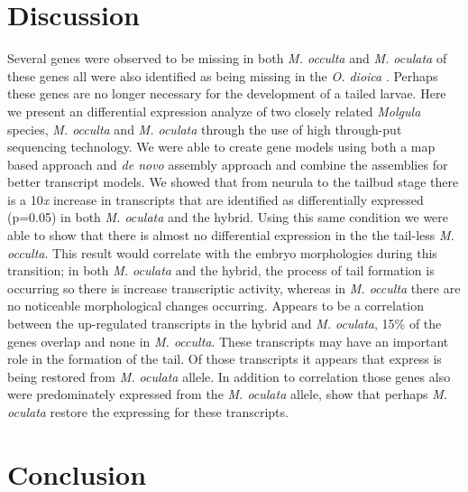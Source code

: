 \section{Discussion}
Several genes were observed to be missing in both \textit{M. occulta} and \textit{M. oculata} of these genes all were also identified as being missing in the \textit{O. dioica} \cite{kugler_evolutionary_2011}. Perhaps these genes are no longer necessary for the development of a tailed larvae.
Here we present an differential expression analyze of two closely related \textit{Molgula} species, \textit{M. occulta} and \textit{M. oculata} through the use of high through-put sequencing technology. We were able to create gene models using both a map based approach and \textit{de novo} assembly approach and combine the assemblies for better transcript models. We showed that from neurula to the tailbud stage there is a 10\textit{x} increase in transcripts that are identified as differentially expressed (p=0.05) in both \textit{M. oculata} and the hybrid. Using this same condition we were able to show that there is almost no differential expression in the the tail-less \textit{M. occulta}. This result would correlate with the embryo morphologies during this transition; in both  \textit{M. oculata} and the hybrid, the process of tail formation is occurring so there is increase transcriptic activity, whereas in \textit{M. occulta} there are no noticeable morphological changes occurring. Appears to be a correlation between the up-regulated transcripts in the hybrid and \textit{M. oculata}, 15\% of the genes overlap and none in \textit{M. occulta}. These transcripts may have an important role in the formation of the tail. Of those transcripts it appears that express is being restored from \textit{M. oculata} allele. In addition to correlation those genes also were predominately expressed from the \textit{M. oculata} allele, show that perhaps \textit{M. oculata} restore the expressing for these transcripts.
\section{Conclusion}

